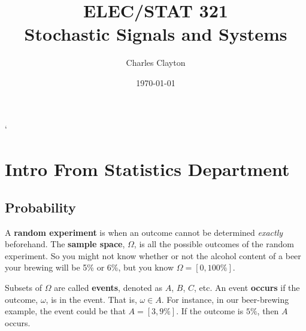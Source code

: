 \documentclass{report}
\begin{document}


\title{\huge ELEC/STAT 321 \\ \Large \medskip Stochastic Signals and Systems}
\author{Charles Clayton}
\date{\today}
\maketitle
`
\thispagestyle{empty}

\setcounter{page}{0}



\singlespacing			\pagebreak
\tableofcontents		\pagebreak

\listoffigures		
\listoftables
\listofmyequations
\pagebreak



\printnoidxglossaries	\pagebreak




\chapter{Intro From Statistics Department}

\newpage 

\section{Probability}

A \textbf{random experiment} is when an outcome cannot be determined \textit{exactly} beforehand. The \textbf{sample space}, $\Omega$,  is all the possible outcomes of the random experiment. So you might not know whether or not the alcohol content of a beer your brewing will be 5\% or 6\%, but you know $\Omega=[0,100\%]$.

Subsets of $\Omega$ are called \textbf{events}, denoted as $A$, $B$, $C$, etc. An event \textbf{occurs} if the outcome, $\omega$, is in the event. That is, $\omega \in A$. For instance, in our beer-brewing example, the event could be that $A=[3,9\%]$. If the outcome is $5\%$, then $A$ occurs.
\end{document}
